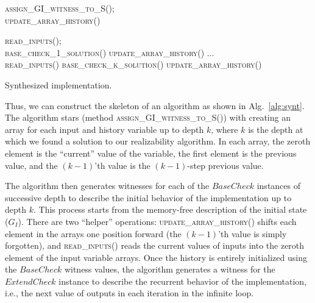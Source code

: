 \begin{algorithm2e}[tb!]
\SetAlgoSkip{}

\BlankLine
  \textsc{assign\_GI\_witness\_to\_S()}; 	\\
  \textsc{update\_array\_history()}\;

\BlankLine
  \textsc{read\_inputs()}; 		\\
  \textsc{base\_check\_1\_solution()}\;
  \textsc{update\_array\_history()}\;
  $\ldots$\\
  \textsc{read\_inputs()}\;
  \textsc{base\_check\_k\_solution()}\;
  \textsc{update\_array\_history()}\;
  
\BlankLine  


\caption{Synthesized implementation.}
\label{alg:synt}
\end{algorithm2e}


Thus, we can construct the skeleton of an algorithm as shown in Alg.~\ref{alg:synt}.  
The algorithm stars (method \textsc{assign\_GI\_witness\_to\_S()}) with creating an array for each input and history variable up to depth
$k$, where $k$ is the depth at which we found a solution to our realizability algorithm.
In each array, the zeroth element is the ``current'' value of the variable, the first element is the previous value, and the $(k-1)$'th value is the $(k-1)$-step previous value.

The algorithm then generates witnesses for each of the $\mathit{BaseCheck}$ instances of
successive depth to describe the initial behavior of
the implementation up to depth $k$.  This process starts from the memory-free
description of the initial state ($G_I$). 
There are two ``helper'' operations:
\textsc{update\_array\_history()} shifts each element in the arrays one position forward
(the $(k-1)$'th value is simply forgotten), and \textsc{read\_inputs()} reads the current values of inputs into the zeroth element of the input variable arrays.  Once the history is entirely initialized using the $\mathit{BaseCheck}$ witness values, 
the algorithm generates a witness for the $\mathit{ExtendCheck}$ instance to describe the recurrent behavior of
the implementation, i.e., the next value of outputs in each iteration in the infinite loop.



